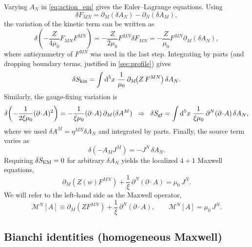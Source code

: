 \documentclass[11pt]{article}
\newcommand{\dd}{\mathrm d}
\newcommand{\A}{A}
\newcommand{\F}{F}
\newcommand{\J}{J}
\newcommand{\Z}{Z}
\newcommand{\muo}{\mu_0}
\newcommand{\xigf}{\xi}
\begin{document}
Varying \(\A_N\) in \cref{eq:action_em} gives the Euler--Lagrange equations.
Using
\begin{equation}
  \delta \F_{MN}=\partial_M(\delta\A_N)-\partial_N(\delta\A_M),
\end{equation}
the variation of the kinetic term can be written as
\begin{equation}
  \delta\!\left(-\frac{\Z}{4\muo}\F_{MN}\F^{MN}\right)
  = -\frac{\Z}{2\muo}\F^{MN}\delta\F_{MN}
  = -\frac{\Z}{\muo}\F^{MN}\partial_M(\delta\A_N),
\end{equation}
where antisymmetry of \(\F^{MN}\) was used in the last step. Integrating by parts
(and dropping boundary terms, justified in \cref{sec:profile}) gives
\begin{equation}
  \delta S_{\rm kin}
  = \int \dd^5x\;\frac{1}{\muo}\,\partial_M\!\big(\Z\,\F^{MN}\big)\,\delta\A_N.
\end{equation}
Similarly, the gauge-fixing variation is
\begin{equation}
  \delta\!\left(-\frac{1}{2\xigf\muo}(\partial\!\cdot\!\A)^2\right)
  = -\frac{1}{\xigf\muo}(\partial\!\cdot\!\A)\,\partial_M(\delta\A^M)
  \;\;\Rightarrow\;\;
  \delta S_{\rm gf}
  = \int \dd^5x\;\frac{1}{\xigf\muo}\,\partial^N(\partial\!\cdot\!\A)\,\delta\A_N,
\end{equation}
where we used \(\delta\A^M=\eta^{MN}\delta\A_N\) and integrated by parts.
Finally, the source term varies as
\begin{equation}
  \delta(-\A_M\J^M) = -\J^N\,\delta\A_N.
\end{equation}
Requiring \(\delta S_{\rm EM}=0\) for arbitrary \(\delta\A_N\) yields the localized
\(4+1\) Maxwell equations,
\begin{equation}
  \partial_M\!\left(\Z(w)\F^{MN}\right)
  + \frac{1}{\xigf}\,\partial^N(\partial\!\cdot\!\A)
  = \muo\,\J^N.
  \label{eq:5d_maxwell_eom_full}
\end{equation}
We will refer to the left-hand side as the Maxwell operator,
\begin{equation}
  \mathcal{M}^N[\A] \equiv
  \partial_M\!\left(\Z\F^{MN}\right)
  + \frac{1}{\xigf}\,\partial^N(\partial\!\cdot\!\A),
  \qquad
  \mathcal{M}^N[\A]=\muo\,\J^N.
\end{equation}

\subsection{Bianchi identities (homogeneous Maxwell)}
\label{sec:bianchi}
\end{document}
